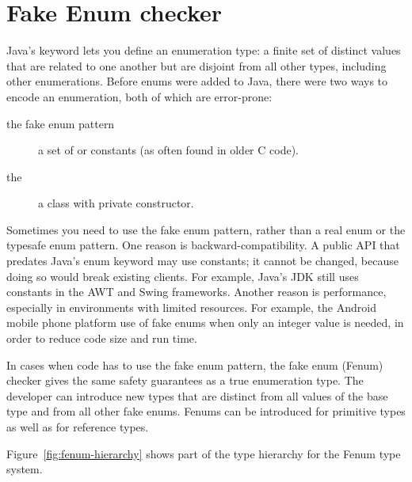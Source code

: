 \htmlhr
\chapter{Fake Enum checker\label{fenum-checker}}

Java's 
keyword lets you define an enumeration type: a finite set of distinct values
that are related to one another but are disjoint from all other
types, including other enumerations.
Before enums were added to Java, there were two ways to encode an
enumeration, both of which are error-prone:

\begin{description}
\item[the fake enum pattern]  a set of  or 
  constants (as often found in older C code).

\item[the ]  a class with private constructor.
\end{description}

Sometimes you need to use the fake enum pattern,
rather than a real enum or the typesafe enum pattern.
%
One reason is backward-compatibility.  A public API that predates Java's
enum keyword may use  constants; it cannot be changed, because
doing so would break existing clients.  For example, Java's JDK still uses
 constants in the AWT and Swing frameworks.
%
Another reason is performance, especially in environments with limited
resources.  For example, the Android mobile phone platform
use of fake enums when only an integer value is needed, in order to reduce
code size and run time.

In cases when code has to use the fake enum pattern, the fake enum (Fenum)
checker gives the same safety guarantees as a true enumeration type. 
The developer can introduce new types that are distinct from all values of the
base type and from all other fake enums. Fenums can be introduced for
primitive types as well as for reference types.

Figure~\ref{fig:fenum-hierarchy} shows part of the type hierarchy for the
Fenum type system.

